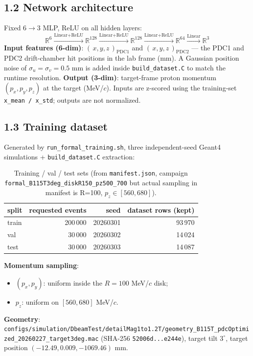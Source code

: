 \documentclass[a4paper,11pt]{article}
\begin{document}
\subsection{1.2 Network architecture}
Fixed 6$\to$3 MLP, ReLU on all hidden layers:
\[
    \mathbb{R}^6 \xrightarrow{\text{Linear+ReLU}} \mathbb{R}^{128}
    \xrightarrow{\text{Linear+ReLU}} \mathbb{R}^{128}
    \xrightarrow{\text{Linear+ReLU}} \mathbb{R}^{64}
    \xrightarrow{\text{Linear}} \mathbb{R}^{3}
\]
\textbf{Input features (6-dim)}: $(\,x, y, z\,)_\text{PDC1}$ and $(\,x, y, z\,)_\text{PDC2}$ --- the PDC1 and PDC2 drift-chamber hit positions in the lab frame (mm).
A Gaussian position noise of $\sigma_u = \sigma_v = 0.5$ mm is added inside \texttt{build\_dataset.C} to match the runtime resolution.
\textbf{Output (3-dim)}: target-frame proton momentum $(p_x, p_y, p_z)$ at the target (MeV/$c$).
Inputs are z-scored using the training-set \texttt{x\_mean / x\_std}; outputs are not normalized.

\subsection{1.3 Training dataset}

Generated by \texttt{run\_formal\_training.sh}, three independent-seed Geant4 simulations + \texttt{build\_dataset.C} extraction:

\begin{table}[H]
\centering\footnotesize
\caption{Training / val / test sets (from \texttt{manifest.json}, campaign \texttt{formal\_B115T3deg\_diskR150\_pz500\_700} but actual sampling in manifest is R=100, $p_z\in[560,680]$).}
\begin{tabular}{lrrr}
\toprule
split & requested events & seed & dataset rows (kept) \\
\midrule
train & 200\,000 & 20260301 & 93\,970 \\
val   & 30\,000  & 20260302 & 14\,024 \\
test  & 30\,000  & 20260303 & 14\,087 \\
\bottomrule
\end{tabular}
\end{table}

\textbf{Momentum sampling}:
\begin{itemize}[nosep]
    \item $(p_x, p_y)$: uniform inside the $R = 100$ MeV/$c$ disk;
    \item $p_z$: uniform on $[560, 680]$ MeV/$c$.
\end{itemize}
\textbf{Geometry}: \texttt{configs/simulation/DbeamTest/detailMag1to1.2T/geometry\_B115T\_pdcOptimized\_20260227\_target3deg.mac}
(SHA-256 \texttt{52006d...e244e}), target tilt $3^\circ$, target position $(-12.49, 0.009, -1069.46)$ mm.
\end{document}
